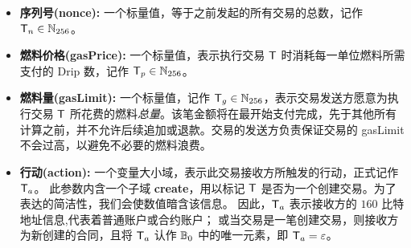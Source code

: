 \begin{itemize} [nosep]
	\item {\bf 序列号(nonce):} 一个标量值，等于之前发起的所有交易的总数，记作 $\textsf{T}_n \in\mathbb{N}_{256}$。

	\item {\bf 燃料价格(gasPrice):} 一个标量值，表示执行交易 $\textsf{T}$ 时消耗每一单位燃料所需支付的 Drip 数，记作 $\textsf{T}_p\in\mathbb{N}_{256}$。

	\item {\bf 燃料量(gasLimit):} 
	一个标量值，记作 $\textsf{T}_g\in\mathbb{N}_{256}$，表示交易发送方愿意为执行交易 $\textsf{T}$ 所花费的燃料\emph{总量}。该笔金额将在最开始支付完成，先于其他所有计算之前，并不允许后续追加或退款。交易的发送方负责保证交易的 gasLimit 不会过高，以避免不必要的燃料浪费。

	\item {\bf 行动(action):} 
	一个变量大小域，表示此交易接收方所触发的行动，正式记作 $\textsf{T}_a$。
	此参数内含一个子域 {\bf create}，用以标记 $\textsf{T}$ 是否为一个创建交易。为了表达的简洁性，我们会使数值暗含该信息。
	因此，$\textsf{T}_a$ 表示接收方的 $160$ 比特地址信息,代表着普通账户或合约账户； 
	或当交易是一笔创建交易，则接收方为新创建的合同，且将 $\textsf{T}_a$ 认作 $\mathbb{B}_0$ 中的唯一元素，即 $\textsf{T}_a = \mathbb{\varepsilon}$。


\end{itemize}
